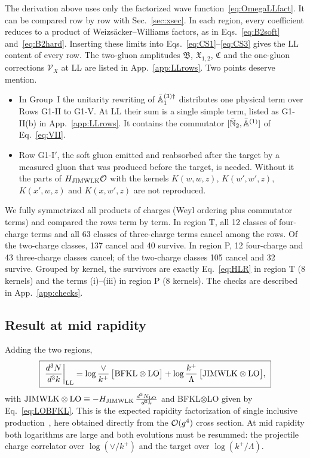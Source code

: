 The derivation above uses only the factorized wave function~\eqref{eq:OmegaLLfact}. It can be compared row by row with Sec.~\ref{sec:xsec}. In each region, every coefficient reduces to a product of Weizs\"acker--Williams factors, as in Eqs.~\eqref{eq:B2soft} and~\eqref{eq:B2hard}. Inserting these limits into Eqs.~\eqref{eq:CS1}--\eqref{eq:CS3} gives the LL content of every row. The two-gluon amplitudes $\mathfrak B$, $\mathfrak X_{1,2}$, $\mathfrak C$ and the one-gluon corrections $\mathcal V_X$ at LL are listed in App.~\ref{app:LLrows}. Two points deserve mention.
\begin{itemize}
\item In Group~I the unitarity rewriting of $\bar{\mathbb{A}}^{(3)\dagger}_1$ distributes one physical term over Rows G1-II to G1-V. At LL their sum is a single simple term, listed as G1-II(b) in App.~\ref{app:LLrows}. It contains the commutator $[\bar{\mathbb{N}}_2,\bar{\mathbb{A}}^{(1)}]$ of Eq.~\eqref{eq:VII}.
\item Row G1-I$'$, the soft gluon emitted and reabsorbed after the target by a measured gluon that was produced before the target, is needed. Without it the parts of $H_{\rm JIMWLK}\mathcal{O}$ with the kernels $K(w,w,z)$, $K(w',w',z)$, $K(x',w,z)$ and $K(x,w',z)$ are not reproduced.
\end{itemize}
We fully symmetrized all products of charges (Weyl ordering plus commutator terms) and compared the rows term by term. In region T, all 12 classes of four-charge terms and all 63 classes of three-charge terms cancel among the rows. Of the two-charge classes, 137 cancel and 40 survive. In region P, 12 four-charge and 43 three-charge classes cancel; of the two-charge classes 105 cancel and 32 survive. Grouped by kernel, the survivors are exactly Eq.~\eqref{eq:HLR} in region T (8 kernels) and the terms (i)--(iii) in region P (8 kernels). The checks are described in App.~\ref{app:checks}.

\subsection{Result at mid rapidity}\label{sec:LLresult}

Adding the two regions,
\begin{equation}
\boxed{\ \frac{d^3N}{d^3k}\bigg|_{\rm LL}=\log\frac{\vee}{k^+}\,\big[{\rm BFKL}\otimes{\rm LO}\big]+\log\frac{k^+}{\Lambda}\,\big[{\rm JIMWLK}\otimes{\rm LO}\big],\ }
\label{eq:LLmain}
\end{equation}
with ${\rm JIMWLK}\otimes{\rm LO}\equiv-H_{\rm JIMWLK}\,\frac{d^3N_{\rm LO}}{d^3k}$ and BFKL$\otimes$LO given by Eq.~\eqref{eq:LOBFKL}.
This is the expected rapidity factorization of single inclusive production~\cite{Kovchegov:2001sc,Baier:2005dv,Kovner:2006ge,Kovner:2006wr,Gelis:2008rw}, here obtained directly from the $\mathcal{O}(g^4)$ cross section. At mid rapidity both logarithms are large and both evolutions must be resummed: the projectile charge correlator over $\log(\vee/k^+)$ and the target over $\log(k^+/\Lambda)$.

